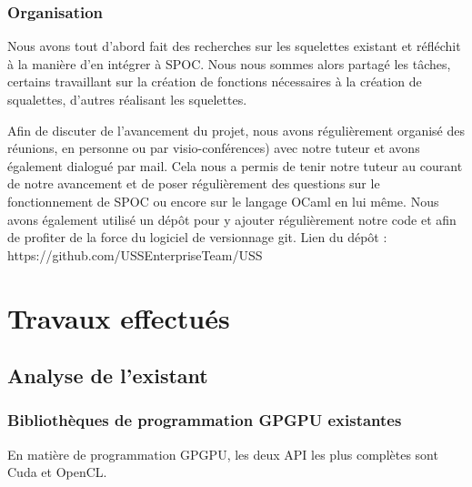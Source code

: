 \documentclass{report}
\begin{document}
\subsection{Organisation}
Nous avons tout d'abord fait des recherches sur les squelettes existant et réfléchit à la manière d'en intégrer à SPOC.\newline
Nous nous sommes alors partagé les tâches, certains travaillant sur la création de fonctions nécessaires à la création de squalettes, d'autres réalisant les squelettes.\newline

Afin de discuter de l'avancement du projet, nous avons régulièrement organisé des réunions, en personne ou par visio-conférences) avec notre tuteur et avons également dialogué par mail.\newline
Cela nous a permis de tenir notre tuteur au courant de notre avancement et de poser régulièrement des questions sur le fonctionnement de SPOC ou encore sur le langage OCaml en lui même.\newline
Nous avons également utilisé un dépôt pour y ajouter régulièrement notre code et afin de profiter de la force du logiciel de versionnage git.\newline
Lien du dépôt : https://github.com/USSEnterpriseTeam/USS

\chapter{Travaux effectués}
\section{Analyse de l'existant}
\subsection{Bibliothèques de programmation GPGPU existantes}
En matière de programmation GPGPU, les deux API les plus complètes sont Cuda et OpenCL.
\end{document}
